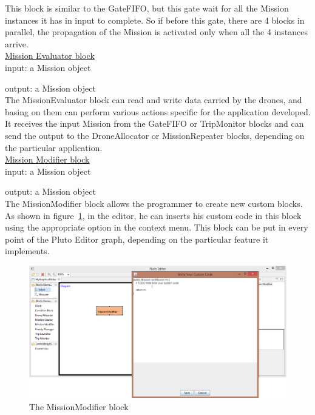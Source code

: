 This block is similar to the GateFIFO, but this gate wait for all the Mission instances it has in input to complete.
So if before this gate, there are 4 blocks in parallel, the propagation of the Mission is activated only when all the 4 instances arrive.
\\

\underline{Mission Evaluator block}
\\

input: a Mission object

output: a Mission object
\\

The MissionEvaluator block can read and write data carried by the drones, and basing on them can perform various actions specific for the application developed.
It receives the input Mission from the GateFIFO or TripMonitor blocks and can send the output to the DroneAllocator or MissionRepeater blocks, depending on the particular application.
\\

\underline{Mission Modifier block}\label{mm}
\\

input: a Mission object

output: a Mission object
\\

The MissionModifier block allows the programmer to create new custom blocks.
As shown in figure~\ref{fig:missionmodifier}, in the editor, he can inserts his custom code in this block using the appropriate option in the context menu.
This block can be put in every point of the Pluto Editor graph, depending on the particular feature it implements.
\\

\begin{figure}[H]
\centering
\includegraphics[width=\linewidth]
{pictures/MissionModifier.png}
  \caption{The MissionModifier block}
  \label{fig:missionmodifier}
\end{figure}

